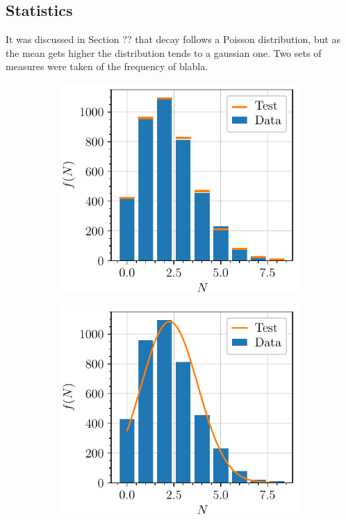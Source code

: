 \subsection{Statistics}
It was discussed in Section ?? that decay follows a Poisson distribution, but as the mean gets higher the distribution tends to a gaussian one.
Two sets of measures were taken of the frequency of blabla.
\begin{figure}[htbp]
    \centering
    \begin{subfigure}{0.495\textwidth}
        \includegraphics[scale=1]{figures/lowmean_poisson.pdf}
        \caption{}
    \end{subfigure}
    \hfill
    \begin{subfigure}{0.495\textwidth}
        \includegraphics[scale=1]{figures/lowmean_gaussian.pdf}

\end{subfigure}
\end{figure}

